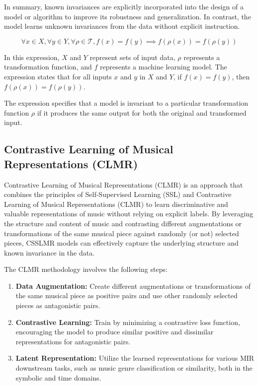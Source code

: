 In summary, known invariances are explicitly incorporated into the design of a model or algorithm to improve its robustness and generalization. In contrast, the model learns unknown invariances from the data without explicit instruction.

\begin{equation}
\forall x \in X, \forall y \in Y, \forall \rho \in \mathcal{T}, f(x) = f(y) \implies f(\rho(x)) = f(\rho(y))
\end{equation}

In this expression, $X$ and $Y$ represent sets of input data, $\rho$ represents a transformation function, and $f$ represents a machine learning model. The expression states that for all inputs $x$ and $y$ in $X$ and $Y$, if $f(x) = f(y)$, then $f(\rho(x)) = f(\rho(y))$.

The expression specifies that a model is invariant to a particular transformation function $\rho$ if it produces the same output for both the original and transformed input.


\subsection{Contrastive Learning of Musical Representations (CLMR)}

Contrastive Learning of Musical Representations (CLMR) is an approach that combines the principles of Self-Supervised Learning (SSL) and Contrastive Learning of Musical Representations (CLMR) \cite{CLMR2021} to learn discriminative and valuable representations of music without relying on explicit labels. By leveraging the structure and content of music and contrasting different augmentations or transformations of the same musical piece against randomly (or not) selected pieces, CSSLMR models can effectively capture the underlying structure and known invariance in the data.

The CLMR methodology involves the following steps:

\begin{enumerate}
\item \textbf{Data Augmentation:} Create different augmentations or transformations of the same musical piece as positive pairs and use other randomly selected pieces as antagonistic pairs.
\item \textbf{Contrastive Learning:} Train by minimizing a contrastive loss function, encouraging the model to produce similar positive and dissimilar representations for antagonistic pairs.
\item\textbf{Latent Representation:} Utilize the learned representations for various MIR downstream tasks, such as music genre classification or similarity, both in the symbolic and time domains.
\end{enumerate} 


